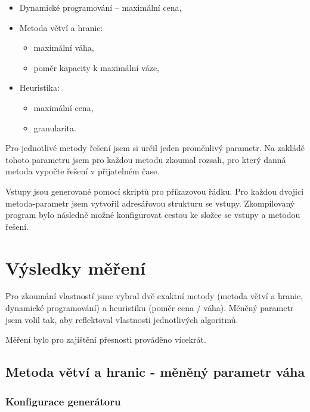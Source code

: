 \documentclass{article}
\begin{document}
\begin{itemize}
    \item Dynamické programování -- maximální cena,
    \item Metoda větví a hranic:
    \begin{itemize}
        \item maximální váha,
        \item poměr kapacity k maximální váze,
    \end{itemize}

    \item Heuristika:
    \begin{itemize}
        \item maximální cena,
        \item granularita.
    \end{itemize}
\end{itemize}

Pro jednotlivé metody řešení jsem si určil jeden proměnlivý parametr.
Na zakládě tohoto parametru jsem pro každou metodu zkoumal rozsah, pro který danná metoda vypočte řešení v přijatelném čase.

Vstupy jsou generované pomocí skriptů pro příkazovou řádku.
Pro každou dvojici metoda-parametr jsem vytvořil adresářovou strukturu se vstupy.
Zkompilovaný program bylo následně možné konfigurovat cestou ke složce se vstupy a metodou řešení.

\section{Výsledky měření}

Pro zkoumání vlastností jsme vybral dvě exaktní metody (metoda větví a hranic, dynamické programování) a heuristiku (poměr cena / váha).
Měněný parametr jsem volil tak, aby reflektoval vlastnosti jednotlivých algoritmů.


Měření bylo pro zajištění přesnosti prováděno vícekrát.

\subsection{Metoda větví a hranic - měněný parametr váha}

\subsubsection*{Konfigurace generátoru}
\end{document}
